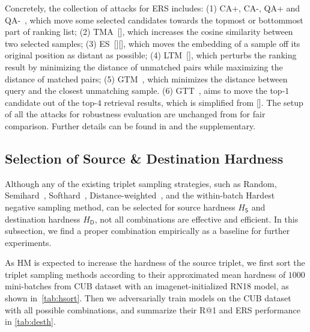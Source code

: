 \documentclass[10pt,twocolumn,letterpaper]{article}
\begin{document}
Concretely, the collection of attacks for ERS includes:
%
(1) CA+, CA-, QA+ and QA-~\cite{advrank}, which move some selected candidates
towards the topmost or bottommost part of ranking list;
%
(2) TMA~[], which increases the cosine similarity between two selected samples;
%
(3) ES~[][], which moves the embedding of a sample off its original position as
distant as possible;
%
(4) LTM~[], which perturbs the ranking result by minimizing the distance of
unmatched pairs while maximizing the distance of matched pairs;
%
(5) GTM~\cite{robrank}, which minimizes the distance between query and the
closest unmatching sample.
%
(6) GTT~\cite{robrank}, aims to move the top-$1$ candidate out of the top-$4$
retrieval results, which is simplified from [].
%
The setup of all the attacks for robustness evaluation are unchanged from
\cite{robrank} for fair comparison.
%
Further details can be found in \cite{robrank} and the supplementary.

\begin{comment}
%
In this section, we first carry out parameter search for the components of the
proposed method, in order to illustrate their effectiveness.
%
The comparison with the state-of-the-art DML defense methods will be presented in the end.
%
\end{comment}

\subsection{Selection of Source \& Destination Hardness}
\label{sec:41}






Although any of the existing triplet sampling strategies, such as Random,
Semihard~\cite{facenet}, Softhard~\cite{revisiting},
Distance-weighted~\cite{distance}, and the within-batch Hardest negative
sampling method, can be selected for source hardness $H_\mathsf{S}$ and
destination hardness $H_\mathsf{D}$, not all combinations are effective and
efficient.
%
In this subsection, we find a proper combination empirically as a baseline for
further experiments.


As HM is expected to increase the hardness of the source triplet, we first sort
the triplet sampling methods according to their approximated mean hardness of
$1000$ mini-batches from CUB dataset with an imagenet-initialized RN18 model,
as shown in~\cref{tab:hsort}.
%
Then we adversarially train models on the CUB dataset with all possible
combinations, and summarize their R@1 and ERS performance in \cref{tab:desth}.
\end{document}
